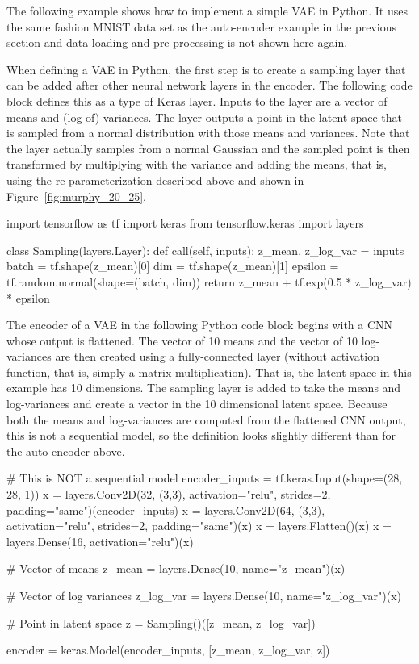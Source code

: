 The following example shows how to implement a simple VAE in Python. It uses the same fashion MNIST data set as the auto-encoder example in the previous section and data loading and pre-processing is not shown here again. 

When defining a VAE in Python, the first step is to create a sampling layer that can be added after other neural network layers in the encoder. The following code block defines this as a type of Keras layer. Inputs to the layer are a vector of means and (log of) variances. The layer outputs a point in the latent space that is sampled from a normal distribution with those means and variances. Note that the layer actually samples from a normal Gaussian and the sampled point is then transformed by multiplying with the variance and adding the means, that is, using the re-parameterization described above and shown in Figure~\ref{fig:murphy_20_25}.

\begin{pythoncode}
import tensorflow as tf
import keras
from tensorflow.keras import layers

class Sampling(layers.Layer):
    def call(self, inputs):
        z_mean, z_log_var = inputs
        batch = tf.shape(z_mean)[0]
        dim = tf.shape(z_mean)[1]
        epsilon = tf.random.normal(shape=(batch, dim))
        return z_mean + tf.exp(0.5 * z_log_var) * epsilon
\end{pythoncode}

The encoder of a VAE in the following Python code block begins with a CNN whose output is flattened. The vector of 10 means and the vector of 10 log-variances are then created using a fully-connected layer (without activation function, that is, simply a matrix multiplication). That is, the latent space in this example has 10 dimensions. The sampling layer is added to take the means and log-variances and create a vector in the 10 dimensional latent space. Because both the means and log-variances are computed from the flattened CNN output, this is not a sequential model, so the definition looks slightly different than for the auto-encoder above.

\begin{pythoncode}
# This is NOT a sequential model
encoder_inputs = tf.keras.Input(shape=(28, 28, 1))
x = layers.Conv2D(32, (3,3), activation="relu", 
             strides=2, padding="same")(encoder_inputs)
x = layers.Conv2D(64, (3,3), activation="relu", 
             strides=2, padding="same")(x)
x = layers.Flatten()(x)
x = layers.Dense(16, activation="relu")(x)

# Vector of means
z_mean = layers.Dense(10, name="z_mean")(x)

# Vector of log variances
z_log_var = layers.Dense(10, name="z_log_var")(x)

# Point in latent space
z = Sampling()([z_mean, z_log_var])

encoder = keras.Model(encoder_inputs, [z_mean, z_log_var, z])
\end{pythoncode}

